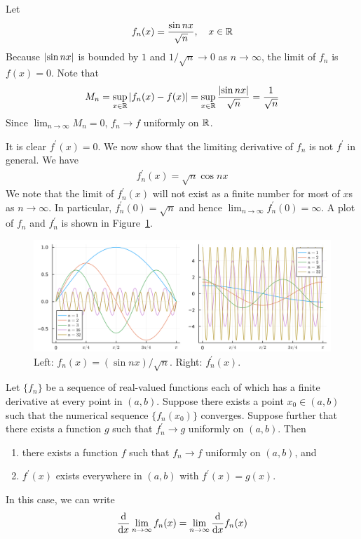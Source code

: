 \documentclass[thmcnt=section, 12pt]{my-elegantbook}
\begin{document}
\begin{example}
    Let 
    \begin{align*}
        f_n(x) = \frac{\sin nx}{\sqrt{n}}, 
        \quad x \in \R
    \end{align*}
    Because $\abs{\sin nx}$ is bounded by $1$ and $1 / \sqrt{n} \to 0$ as $n \to \infty$, the limit of $f_n$ is $f(x) = 0$. Note that 
    \begin{align*}
        M_n = \sup_{x \in \R} \abs{f_n(x) - f(x)}
        = \sup_{x \in \R} \frac{\abs{\sin nx}}{\sqrt{n}}
        = \frac{1}{\sqrt{n}}
    \end{align*}
    Since $\lim_{n \to \infty} M_n = 0$, $f_n \to f$ uniformly on $\R$.

    It is clear $f^\prime(x) = 0$. We now show that the limiting derivative of $f_n$ is not $f^\prime$ in general. We have 
    \begin{align*}
        f^\prime_n(x) = \sqrt{n} \cos nx
    \end{align*}
    We note that the limit of $f^\prime_n(x)$ will not exist as a finite number for most of $x$s as $n \to \infty$. In particular, $f^\prime_n(0) = \sqrt{n}$ and hence $\lim_{n \to \infty} f^\prime_n(0) = \infty$. A plot of $f_n$ and $f^\prime_n$ is shown in Figure~\ref{fig:11}.

    \begin{figure}[ht]
        \centering
        \includegraphics[scale=0.2]{figures/graph-010.png}
        \caption{Left: $f_n(x) = (\sin nx) / \sqrt{n}$. Right: $f^\prime_n(x)$.}
        \label{fig:11}
    \end{figure}
\end{example}

\begin{theorem} \label{thm:44}
    Let $\{f_n\}$ be a sequence of real-valued functions each of which has a finite derivative at every point in $(a, b)$. Suppose there exists a point $x_0 \in (a, b)$ such that the numerical sequence $\{f_n(x_0)\}$ converges. Suppose further that there exists a function $g$ such that $f^\prime_n \to g$ uniformly on $(a, b)$. Then 
    \begin{enumerate}
        \item there exists a function $f$ such that $f_n \to f$ uniformly on $(a, b)$, and
        \item $f^\prime(x)$ exists everywhere in $(a, b)$ with $f^\prime(x) = g(x)$.
    \end{enumerate}
    In this case, we can write
    \begin{align*}
        \odvs{\lim_{n \to \infty} f_n(x)}{x}
        = \lim_{n \to \infty} \odvs{f_n(x)}{x}
    \end{align*}
\end{theorem}
\end{document}
